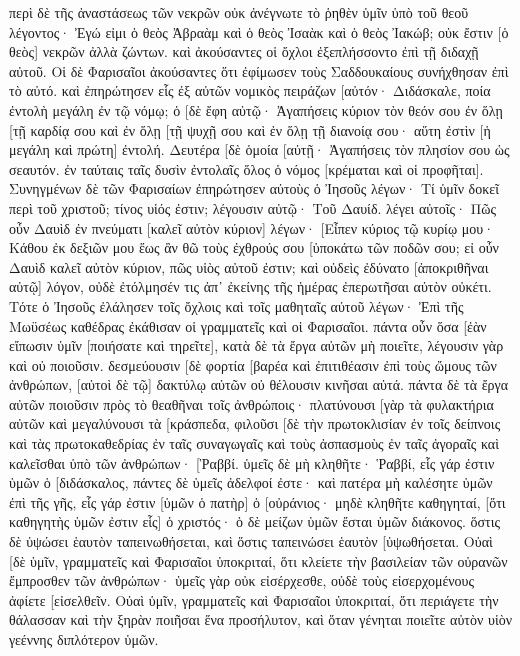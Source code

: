περὶ δὲ τῆς ἀναστάσεως τῶν νεκρῶν οὐκ ἀνέγνωτε τὸ ῥηθὲν ὑμῖν ὑπὸ τοῦ θεοῦ λέγοντος· 
Ἐγώ εἰμι ὁ θεὸς Ἀβραὰμ καὶ ὁ θεὸς Ἰσαὰκ καὶ ὁ θεὸς Ἰακώβ; οὐκ ἔστιν [ὁ θεὸς] νεκρῶν ἀλλὰ ζώντων. 
καὶ ἀκούσαντες οἱ ὄχλοι ἐξεπλήσσοντο ἐπὶ τῇ διδαχῇ αὐτοῦ. 
Οἱ δὲ Φαρισαῖοι ἀκούσαντες ὅτι ἐφίμωσεν τοὺς Σαδδουκαίους συνήχθησαν ἐπὶ τὸ αὐτό. 
καὶ ἐπηρώτησεν εἷς ἐξ αὐτῶν νομικὸς πειράζων [αὐτόν· 
Διδάσκαλε, ποία ἐντολὴ μεγάλη ἐν τῷ νόμῳ; 
ὁ [δὲ ἔφη αὐτῷ· Ἀγαπήσεις κύριον τὸν θεόν σου ἐν ὅλῃ [τῇ καρδίᾳ σου καὶ ἐν ὅλῃ [τῇ ψυχῇ σου καὶ ἐν ὅλῃ τῇ διανοίᾳ σου· 
αὕτη ἐστὶν [ἡ μεγάλη καὶ πρώτη] ἐντολή. 
Δευτέρα [δὲ ὁμοία [αὐτῇ· Ἀγαπήσεις τὸν πλησίον σου ὡς σεαυτόν. 
ἐν ταύταις ταῖς δυσὶν ἐντολαῖς ὅλος ὁ νόμος [κρέμαται καὶ οἱ προφῆται]. 
Συνηγμένων δὲ τῶν Φαρισαίων ἐπηρώτησεν αὐτοὺς ὁ Ἰησοῦς 
λέγων· Τί ὑμῖν δοκεῖ περὶ τοῦ χριστοῦ; τίνος υἱός ἐστιν; λέγουσιν αὐτῷ· Τοῦ Δαυίδ. 
λέγει αὐτοῖς· Πῶς οὖν Δαυὶδ ἐν πνεύματι [καλεῖ αὐτὸν κύριον] λέγων· 
[Εἶπεν κύριος τῷ κυρίῳ μου· Κάθου ἐκ δεξιῶν μου ἕως ἂν θῶ τοὺς ἐχθρούς σου [ὑποκάτω τῶν ποδῶν σου; 
εἰ οὖν Δαυὶδ καλεῖ αὐτὸν κύριον, πῶς υἱὸς αὐτοῦ ἐστιν; 
καὶ οὐδεὶς ἐδύνατο [ἀποκριθῆναι αὐτῷ] λόγον, οὐδὲ ἐτόλμησέν τις ἀπ᾽ ἐκείνης τῆς ἡμέρας ἐπερωτῆσαι αὐτὸν οὐκέτι. 
Τότε ὁ Ἰησοῦς ἐλάλησεν τοῖς ὄχλοις καὶ τοῖς μαθηταῖς αὐτοῦ 
λέγων· Ἐπὶ τῆς Μωϋσέως καθέδρας ἐκάθισαν οἱ γραμματεῖς καὶ οἱ Φαρισαῖοι. 
πάντα οὖν ὅσα [ἐὰν εἴπωσιν ὑμῖν [ποιήσατε καὶ τηρεῖτε], κατὰ δὲ τὰ ἔργα αὐτῶν μὴ ποιεῖτε, λέγουσιν γὰρ καὶ οὐ ποιοῦσιν. 
δεσμεύουσιν [δὲ φορτία [βαρέα καὶ ἐπιτιθέασιν ἐπὶ τοὺς ὤμους τῶν ἀνθρώπων, [αὐτοὶ δὲ τῷ] δακτύλῳ αὐτῶν οὐ θέλουσιν κινῆσαι αὐτά. 
πάντα δὲ τὰ ἔργα αὐτῶν ποιοῦσιν πρὸς τὸ θεαθῆναι τοῖς ἀνθρώποις· πλατύνουσι [γὰρ τὰ φυλακτήρια αὐτῶν καὶ μεγαλύνουσι τὰ [κράσπεδα, 
φιλοῦσι [δὲ τὴν πρωτοκλισίαν ἐν τοῖς δείπνοις καὶ τὰς πρωτοκαθεδρίας ἐν ταῖς συναγωγαῖς 
καὶ τοὺς ἀσπασμοὺς ἐν ταῖς ἀγοραῖς καὶ καλεῖσθαι ὑπὸ τῶν ἀνθρώπων· [Ῥαββί. 
ὑμεῖς δὲ μὴ κληθῆτε· Ῥαββί, εἷς γάρ ἐστιν ὑμῶν ὁ [διδάσκαλος, πάντες δὲ ὑμεῖς ἀδελφοί ἐστε· 
καὶ πατέρα μὴ καλέσητε ὑμῶν ἐπὶ τῆς γῆς, εἷς γάρ ἐστιν [ὑμῶν ὁ πατὴρ] ὁ [οὐράνιος· 
μηδὲ κληθῆτε καθηγηταί, [ὅτι καθηγητὴς ὑμῶν ἐστιν εἷς] ὁ χριστός· 
ὁ δὲ μείζων ὑμῶν ἔσται ὑμῶν διάκονος. 
ὅστις δὲ ὑψώσει ἑαυτὸν ταπεινωθήσεται, καὶ ὅστις ταπεινώσει ἑαυτὸν [ὑψωθήσεται. 
Οὐαὶ [δὲ ὑμῖν, γραμματεῖς καὶ Φαρισαῖοι ὑποκριταί, ὅτι κλείετε τὴν βασιλείαν τῶν οὐρανῶν ἔμπροσθεν τῶν ἀνθρώπων· ὑμεῖς γὰρ οὐκ εἰσέρχεσθε, οὐδὲ τοὺς εἰσερχομένους ἀφίετε [εἰσελθεῖν. 
Οὐαὶ ὑμῖν, γραμματεῖς καὶ Φαρισαῖοι ὑποκριταί, ὅτι περιάγετε τὴν θάλασσαν καὶ τὴν ξηρὰν ποιῆσαι ἕνα προσήλυτον, καὶ ὅταν γένηται ποιεῖτε αὐτὸν υἱὸν γεέννης διπλότερον ὑμῶν. 
